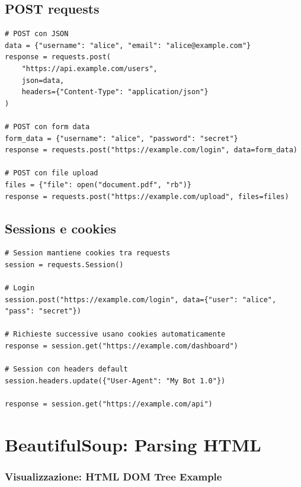 \subsection{POST requests}

\begin{lstlisting}
# POST con JSON
data = {"username": "alice", "email": "alice@example.com"}
response = requests.post(
    "https://api.example.com/users",
    json=data,
    headers={"Content-Type": "application/json"}
)

# POST con form data
form_data = {"username": "alice", "password": "secret"}
response = requests.post("https://example.com/login", data=form_data)

# POST con file upload
files = {"file": open("document.pdf", "rb")}
response = requests.post("https://example.com/upload", files=files)
\end{lstlisting}

\subsection{Sessions e cookies}

\begin{lstlisting}
# Session mantiene cookies tra requests
session = requests.Session()

# Login
session.post("https://example.com/login", data={"user": "alice", "pass": "secret"})

# Richieste successive usano cookies automaticamente
response = session.get("https://example.com/dashboard")

# Session con headers default
session.headers.update({"User-Agent": "My Bot 1.0"})

response = session.get("https://example.com/api")
\end{lstlisting}

\section{BeautifulSoup: Parsing HTML}

\subsubsection{Visualizzazione: HTML DOM Tree Example}

\begin{center}
\end{center}

